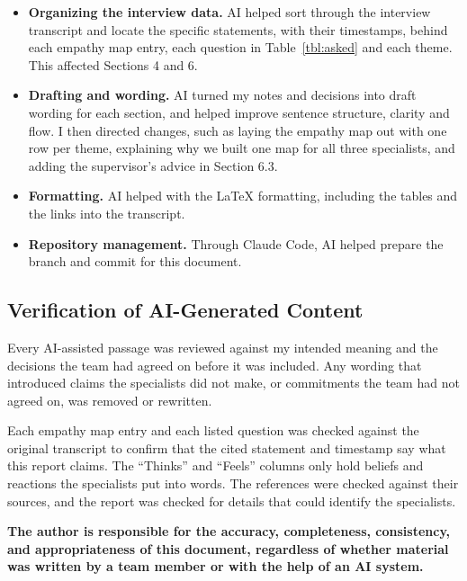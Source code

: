 \documentclass{article}
\begin{document}
\begin{itemize}
  \item \textbf{Organizing the interview data.} AI helped sort through the
  interview transcript and locate the specific statements, with their
  timestamps, behind each empathy map entry, each question in
  Table~\ref{tbl:asked} and each theme. This affected Sections 4 and 6.

  \item \textbf{Drafting and wording.} AI turned my notes and decisions into
  draft wording for each section, and helped improve sentence structure,
  clarity and flow. I then directed changes, such as laying the empathy map out
  with one row per theme, explaining why we built one map for all three
  specialists, and adding the supervisor's advice in Section 6.3.

  \item \textbf{Formatting.} AI helped with the \LaTeX{} formatting, including
  the tables and the links into the transcript.

  \item \textbf{Repository management.} Through Claude Code, AI helped prepare
  the branch and commit for this document.
\end{itemize}

\subsection{Verification of AI-Generated Content}

Every AI-assisted passage was reviewed against my intended meaning and the
decisions the team had agreed on before it was included. Any wording that
introduced claims the specialists did not make, or commitments the team had
not agreed on, was removed or rewritten.

Each empathy map entry and each listed question was checked against the
original transcript to confirm that the cited statement and timestamp say what
this report claims. The ``Thinks'' and ``Feels'' columns only hold beliefs and
reactions the specialists put into words. The references were checked against
their sources, and the report was checked for details that could identify the
specialists.

\textbf{The author is responsible for the accuracy, completeness, consistency,
and appropriateness of this document, regardless of whether material was
written by a team member or with the help of an AI system.}

\newpage

\end{document}
